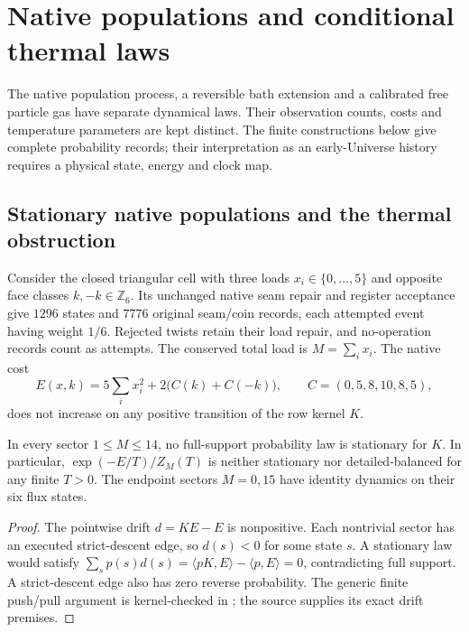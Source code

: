 \section{Native populations and conditional thermal laws}
\label{sec:native-thermal-records}

The native population process, a reversible bath extension and a calibrated
free particle gas have separate dynamical laws. Their observation counts,
costs and temperature parameters are kept distinct. The finite constructions
below give complete probability records; their interpretation as an
early-Universe history requires a physical state, energy and clock map.

\subsection{Stationary native populations and the thermal obstruction}

Consider the closed triangular cell with three loads $x_i\in\{0,\ldots,5\}$
and opposite face classes $k,-k\in\mathbb Z_6$. Its unchanged native
seam repair and register acceptance give $1296$ states and $7776$ original
seam/coin records, each attempted event having weight $1/6$. Rejected
twists retain their load repair, and no-operation records count as attempts.
The conserved total load is $M=\sum_i x_i$. The native cost
\[
 E(x,k)=5\sum_i x_i^2+2\bigl(C(k)+C(-k)\bigr),\qquad
 C=(0,5,8,10,8,5),
\]
does not increase on any positive transition of the row kernel $K$.

\begin{proposition}
In every sector $1\leq M\leq14$, no full-support probability law is
stationary for $K$. In particular, $\exp(-E/T)/Z_M(T)$ is neither
stationary nor detailed-balanced for any finite $T>0$. The endpoint
sectors $M=0,15$ have identity dynamics on their six flux states.
\end{proposition}
\begin{proof}
The pointwise drift $d=KE-E$ is nonpositive. Each nontrivial sector has
an executed strict-descent edge, so $d(s)<0$ for some state $s$. A
stationary law would satisfy
$\sum_s p(s)d(s)=\langle pK,E\rangle-\langle p,E\rangle=0$,
contradicting full support. A strict-descent edge also has zero reverse
probability. The generic finite push/pull argument is kernel-checked in
; the source supplies its
exact drift premises.
\end{proof}

